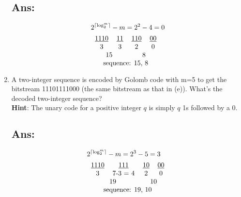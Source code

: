 \documentclass[a4paper, 11pt, oneside]{article} %
\DeclarePairedDelimiter\ceil{\lceil}{\rceil}
\begin{document}
\begin{enumerate}[label=(\alph*)]
  	\subsection*{Ans:}
    \begin{align*}
		&2^{\ceil*{\log_2^{m}}}-m=2^{2}-4 = 0 \\
		&\begin{tabular}{ cccc } 
			\underline{1110} & \underline{11} & \underline{110} & \underline{00} \\
			3                & 3              & 2               & 0 \\
		\multicolumn{2}{c}{15} & \multicolumn{2}{c}{8} \\
		\multicolumn{4}{c}{sequence: 15, 8} 
		\end{tabular} \\
	\end{align*}
	
	\clearpage

	\item A two-integer sequence is encoded by Golomb code with m=5 to get the bitstream
	11101111000 (the same bitstream as that in (e)). What’s the decoded two-integer sequence?\\
	\textbf{Hint}: The unary code for a positive integer $q$ is simply $q$ 1s followed by a $0$.
	\subsection*{Ans:}
	\begin{align*}
		&2^{\ceil*{\log_2^{m}}}-m=2^{3}-5 = 3 \\
		&\begin{tabular}{ cccc } 
		\underline{1110} & \underline{111} & \underline{10} & \underline{00} \\
		3                & 7-3 = 4         & 2              & 0 \\
		\multicolumn{2}{c}{19} & \multicolumn{2}{c}{10} \\
		\multicolumn{4}{c}{sequence: 19, 10} 
		\end{tabular} \\
	\end{align*}


\end{enumerate}
\end{document}
